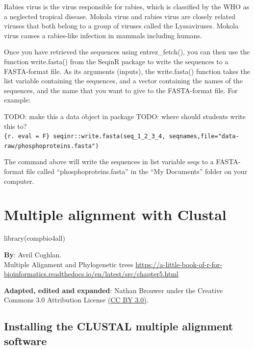 \documentclass[
]{book}
\newenvironment{Shaded}{\begin{snugshade}}{\end{snugshade}}
\newcommand{\FunctionTok}[1]{\textcolor[rgb]{0.00,0.00,0.00}{#1}}
\newcommand{\NormalTok}[1]{#1}
\begin{document}
Rabies virus is the virus responsible for rabies, which is classified by the WHO as a neglected tropical disease. Mokola virus and rabies virus are closely related viruses that both belong to a group of viruses called the Lyssaviruses. Mokola virus causes a rabies-like infection in mammals including humans.

Once you have retrieved the sequences using entrez\_fetch(), you can then use the function write.fasta() from the SeqinR package to write the sequences to a FASTA-format file. As its arguments (inputs), the write.fasta() function takes the list variable containing the sequences, and a vector containing the names of the sequences, and the name that you want to give to the FASTA-format file. For example:

TODO: make this a data object in package
TODO: where should students write this to?
\texttt{\{r.\ eval\ =\ F\}\ seqinr::write.fasta(seq\_1\_2\_3\_4,\ seqnames,file="data-raw/phosphoproteins.fasta")}

The command above will write the sequences in list variable seqs to a FASTA-format file called ``phosphoproteins.fasta'' in the ``My Documents'' folder on your computer.

\hypertarget{multiple-alignment-with-clustal}{%
\chapter{Multiple alignment with Clustal}\label{multiple-alignment-with-clustal}}

\begin{Shaded}
\begin{Highlighting}[]
\FunctionTok{library}\NormalTok{(compbio4all)}
\end{Highlighting}
\end{Shaded}

\textbf{By}: Avril Coghlan.\\
Multiple Alignment and Phylogenetic trees
\url{https://a-little-book-of-r-for-bioinformatics.readthedocs.io/en/latest/src/chapter5.html}

\textbf{Adapted, edited and expanded}: Nathan Brouwer under the Creative Commons 3.0 Attribution License \href{https://creativecommons.org/licenses/by/3.0/}{(CC BY 3.0)}.

\hypertarget{installing-the-clustal-multiple-alignment-software}{%
\section{Installing the CLUSTAL multiple alignment software}\label{installing-the-clustal-multiple-alignment-software}}
\end{document}
